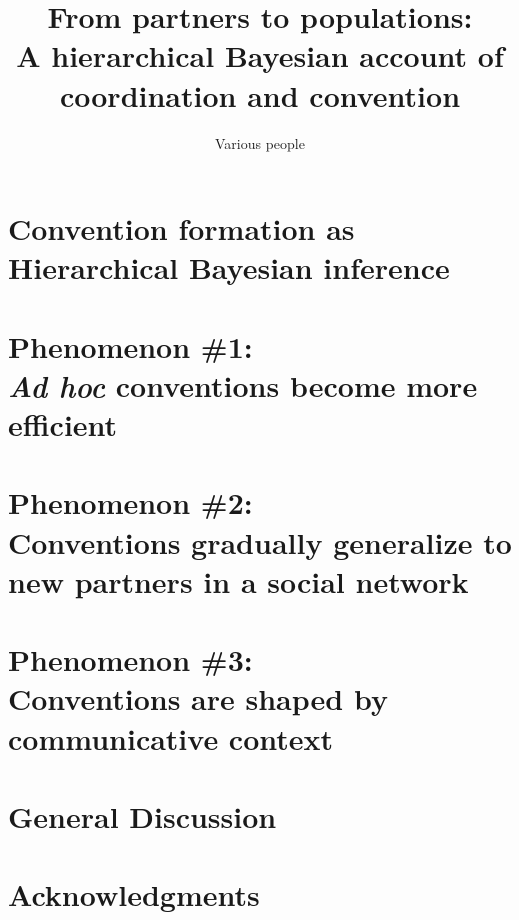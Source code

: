 \documentclass[11pt, floatsintext]{apa6}
\title{From partners to populations: \\[.1em] A hierarchical Bayesian account of coordination and convention}
\author{Various people}
\affiliation{Various Universities}
\begin{document}
\maketitle

\begin{quote}

\end{quote}



\section{Convention formation as\\ Hierarchical Bayesian inference}



\section{Phenomenon \#1: \\ \emph{Ad hoc} conventions become more efficient}



\section{Phenomenon \#2: \\ Conventions gradually generalize to new partners in a social network}



\section{Phenomenon \#3: \\ Conventions are shaped by communicative context}



\section{General Discussion}



\section{\bf Acknowledgments}
\small
\end{document}
